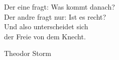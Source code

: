 \newpage
\cleardoublepage

\vspace*{\fill}

\begin{center}
Der eine fragt: Was kommt danach? \\
Der andre fragt nur: Ist es recht? \\
Und also unterscheidet sich \\
der Freie von dem Knecht.
\end{center}

\begin{flushright}
Theodor Storm
\end{flushright}

\vspace*{\fill}


